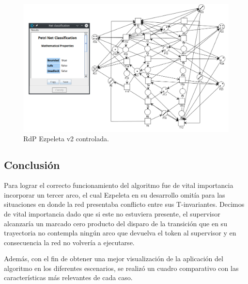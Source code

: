 \begin{figure}[H]
	\centering
	\includegraphics[scale=0.48]{Figures/algoritmo3/ezpeletav27.png}
	\caption{RdP Ezpeleta v2 controlada.}
	\label{fig:control_ezpeletav2}
 \end{figure}

\subsection{Conclusión}
Para lograr el correcto funcionamiento del algoritmo fue de vital importancia incorporar un tercer arco, el cual Ezpeleta en su desarrollo omitía para las situaciones en donde la red presentaba conflicto entre sus T-invariantes. Decimos de vital importancia dado que si este no estuviera presente, el supervisor alcanzaría un marcado cero producto del disparo de la transición que en su trayectoria no contempla ningún arco que devuelva el token al supervisor y en consecuencia la red no volvería a ejecutarse. \\

\par Además, con el fin de obtener una mejor visualización de la aplicación del algoritmo en los diferentes escenarios, se realizó un cuadro comparativo con las características más relevantes de cada caso.


